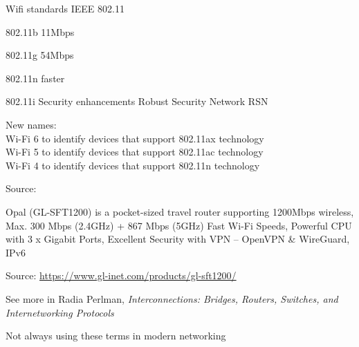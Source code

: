 \documentclass[Screen16to9,17pt]{foils}
\begin{document}

\begin{list1}
\item Wifi standards IEEE 802.11
\begin{list2}
\item 802.11b 11Mbps
\item 802.11g 54Mbps
\item 802.11n faster
\item 802.11i Security enhancements Robust Security Network RSN
\end{list2}
\item New names:\\
Wi-Fi 6 to identify devices that support 802.11ax technology\\
Wi-Fi 5 to identify devices that support 802.11ac technology\\
Wi-Fi 4 to identify devices that support 802.11n technology
\end{list1}

Source: 





\begin{list2}
\item Opal (GL-SFT1200) is a pocket-sized travel router supporting 1200Mbps wireless,
Max. 300 Mbps (2.4GHz) + 867 Mbps (5GHz) Fast Wi-Fi Speeds, Powerful CPU with 3 x Gigabit Ports,
Excellent Security with VPN -- OpenVPN \& WireGuard, IPv6
\end{list2}
Source: \url{https://www.gl-inet.com/products/gl-sft1200/}




See more in Radia Perlman, \emph{Interconnections: Bridges, Routers, Switches, and Internetworking Protocols}



\centerline{Not always using these terms in modern networking}



\end{document}
